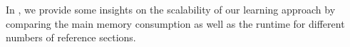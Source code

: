 
\bigskip


In , we provide some insights on the scalability of our learning approach by comparing the main memory consumption as well as the runtime for different numbers of reference sections.


